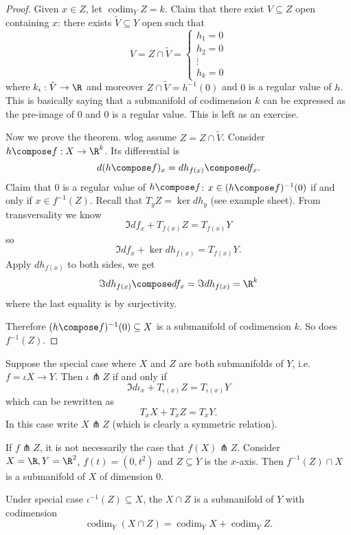 \documentclass[a4paper]{article}
\DeclareMathOperator{\codim}{codim}
\begin{document}
\begin{proof}
  Given \(x \in Z\), let \(\codim_Y Z = k\). Claim that there exist \(V \subseteq Z\) open containing \(x\): there exists \(\tilde V \subseteq Y\) open such that
  \[
    V = Z \cap \tilde V =
    \begin{cases}
      h_1 = 0 \\
      h_2 = 0 \\
      \vdots \\
      h_k = 0
    \end{cases}
  \]
  where \(k_i: \tilde V \to \R\) and moreover \(Z \cap \tilde V = h^{-1}(0)\) and \(0\) is a regular value of \(h\). This is basically saying that a submanifold of codimension \(k\) can be expressed as the pre-image of \(0\) and \(0\) is a regular value. This is left as an exercise.

  Now we prove the theorem. wlog assume \(Z = Z \cap \tilde V\). Consider \(h \compose f: X \to \R^k\). Its differential is
  \[
    d(h \compose f)_x = dh_{f(x)} \compose df_x.
  \]
  Claim that \(0\) is a regular value of \(h \compose f\): \(x \in (h \compose f)^{-1}(0)\) if and only if \(x \in f^{-1}(Z)\). Recall that \(T_yZ = \ker dh_y\) (see example sheet). From transversality we know
  \[
    \Im df_x + T_{f(x)}Z = T_{f(x)}Y
  \]
  so
  \[
    \Im df_x + \ker dh_{f(x)} = T_{f(x)}Y.
  \]
  Apply \(dh_{f(x)}\) to both sides, we get
  \[
    \Im dh_{f(x)} \compose df_x = \Im dh_{f(x)} = \R^k
  \]
  where the last equality is by surjectivity.

  Therefore \((h \compose f)^{-1}(0) \subseteq X\) is a submanifold of codimension \(k\). So does \(f^{-1}(Z)\).
\end{proof}

Suppose the special case where \(X\) and \(Z\) are both submanifolds of \(Y\), i.e.\ \(f = \iota X \to Y\). Then \(\iota \pitchfork Z\) if and only if
\[
  \Im d\iota_x + T_{\iota(x)}Z = T_{\iota(x)}Y
\]
which can be rewritten as
\[
  T_xX + T_xZ = T_xY.
\]
In this case write \(X \pitchfork Z\) (which is clearly a symmetric relation).

\begin{eg}
  If \(f \pitchfork Z\), it is not necessarily the case that \(f(X) \pitchfork Z\). Consider \(X = \R, Y = \R^2\), \(f(t) = (0, t^2)\) and \(Z \subseteq Y\) is the \(x\)-axis. Then \(f^{-1}(Z) \cap X\) is a submanifold of \(X\) of dimension \(0\).
\end{eg}

\begin{corollary}
  Under special case \(\iota^{-1}(Z) \subseteq X\), the \(X \cap Z\) is a submanifold of \(Y\) with codimension
  \[
    \codim_Y(X \cap Z) = \codim_Y X + \codim_Y Z.
  \]
\end{corollary}
\end{document}
